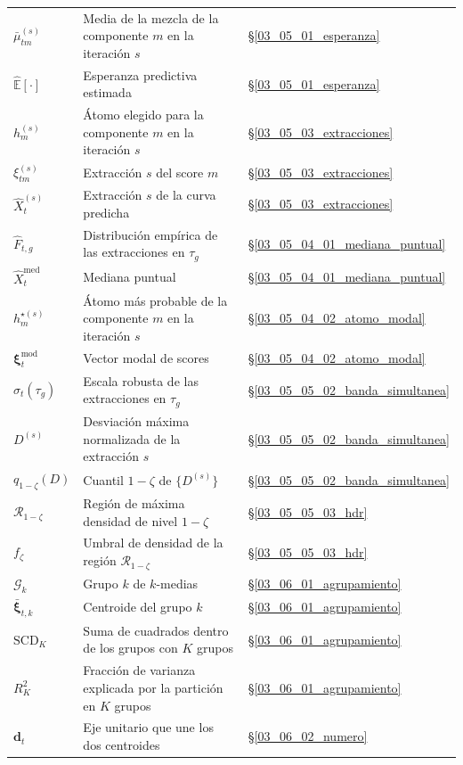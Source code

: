 \begin{longtable}{p{} p{} p{}}
$\bar{\mu}_{tm}^{(s)}$ & Media de la mezcla de la componente $m$ en la iteración $s$ & \S\ref{03_05_01_esperanza} \\
$\widehat{\mathbb{E}}[\cdot]$ & Esperanza predictiva estimada & \S\ref{03_05_01_esperanza} \\
$h_m^{(s)}$ & Átomo elegido para la componente $m$ en la iteración $s$ & \S\ref{03_05_03_extracciones} \\
$\xi_{tm}^{(s)}$ & Extracción $s$ del score $m$ & \S\ref{03_05_03_extracciones} \\
$\widehat{X}_t^{(s)}$ & Extracción $s$ de la curva predicha & \S\ref{03_05_03_extracciones} \\
$\widehat{F}_{t,g}$ & Distribución empírica de las extracciones en $\tau_g$ & \S\ref{03_05_04_01_mediana_puntual} \\
$\widehat{X}_t^{\mathrm{med}}$ & Mediana puntual & \S\ref{03_05_04_01_mediana_puntual} \\
$h_m^{\star(s)}$ & Átomo más probable de la componente $m$ en la iteración $s$ & \S\ref{03_05_04_02_atomo_modal} \\
$\boldsymbol{\xi}_t^{\mathrm{mod}}$ & Vector modal de scores & \S\ref{03_05_04_02_atomo_modal} \\
$\widehat{\sigma}_t(\tau_g)$ & Escala robusta de las extracciones en $\tau_g$ & \S\ref{03_05_05_02_banda_simultanea} \\
$D^{(s)}$ & Desviación máxima normalizada de la extracción $s$ & \S\ref{03_05_05_02_banda_simultanea} \\
$q_{1-\zeta}(D)$ & Cuantil $1-\zeta$ de $\{D^{(s)}\}$ & \S\ref{03_05_05_02_banda_simultanea} \\
$\mathcal{R}_{1-\zeta}$ & Región de máxima densidad de nivel $1-\zeta$ & \S\ref{03_05_05_03_hdr} \\
$f_\zeta$ & Umbral de densidad de la región $\mathcal{R}_{1-\zeta}$ & \S\ref{03_05_05_03_hdr} \\
$\mathcal{G}_k$ & Grupo $k$ de $k$-medias & \S\ref{03_06_01_agrupamiento} \\
$\bar{\boldsymbol{\xi}}_{t,k}$ & Centroide del grupo $k$ & \S\ref{03_06_01_agrupamiento} \\
$\mathrm{SCD}_K$ & Suma de cuadrados dentro de los grupos con $K$ grupos & \S\ref{03_06_01_agrupamiento} \\
$R^2_K$ & Fracción de varianza explicada por la partición en $K$ grupos & \S\ref{03_06_01_agrupamiento} \\
$\mathbf{d}_t$ & Eje unitario que une los dos centroides & \S\ref{03_06_02_numero} \\

\end{longtable}

